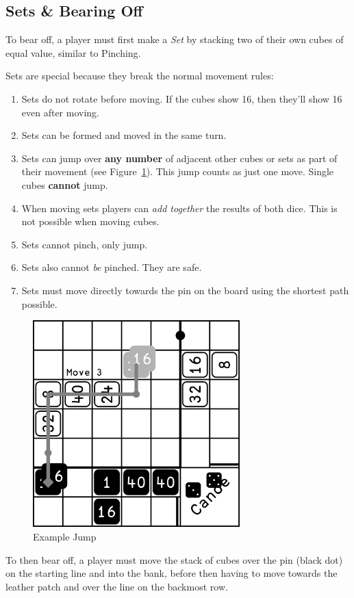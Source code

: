 \subsection{Sets \& Bearing Off}\label{sec:bearing-off}
To bear off, a player must first make a \textit{Set} by stacking two of their own cubes of equal value, similar to Pinching.

Sets are special because they break the normal movement rules:
\begin{enumerate}
    \item Sets do not rotate before moving. If the cubes show 16, then they'll show 16 even after moving.
    \item Sets can be formed and moved in the same turn.
    \item Sets can jump over \textbf{any number} of adjacent other cubes or sets as part of their movement (see Figure~\ref{fig:jump}). This jump counts as just one move. Single cubes \textbf{cannot} jump.
    \item When moving sets players can \textit{add together} the results of both dice. This is not possible when moving cubes.
    \item Sets cannot pinch, only jump.
    \item Sets also cannot \textit{be} pinched. They are safe.
    \item Sets must move directly towards the pin on the board using the shortest path possible.
\end{enumerate}
\begin{figure}[!h]
    \centering
    \includegraphics[width=8cm]{../graphics/jump}
    \caption{Example Jump}
    \label{fig:jump}
\end{figure}
To then bear off, a player must move the stack of cubes over the pin (black dot) on the starting line and into the bank, before then having to move towards the leather patch and over the line on the backmost row.


